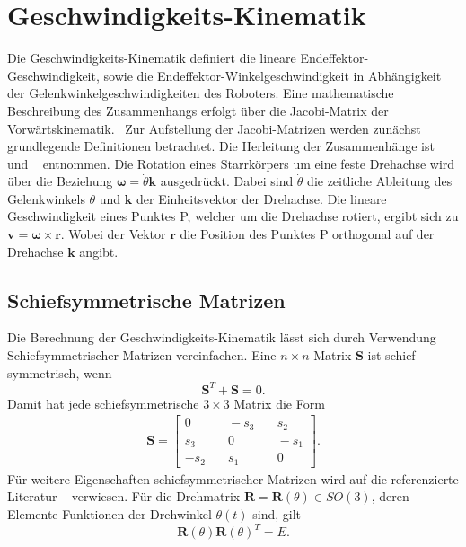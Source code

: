 \section{Geschwindigkeits-Kinematik}
Die Geschwindigkeits-Kinematik definiert die lineare Endeffektor-Geschwindigkeit, sowie die  Endeffektor-Winkelgeschwindigkeit in Abh{\"a}ngigkeit der Gelenkwinkelgeschwindigkeiten des Roboters. Eine mathematische Beschreibung des Zusammenhangs erfolgt {\"u}ber die Jacobi-Matrix der Vorw{\"a}rtskinematik.~\autocite[S.~101]{Spong.2020} Zur Aufstellung der Jacobi-Matrizen werden zunächst grundlegende Definitionen betrachtet. Die Herleitung der Zusammenhänge ist ~\autocite[S.~79--80]{Kemmetmueller.2023} und ~\autocite[S.~106]{Spong.2020} entnommen. Die Rotation eines Starrk{\"o}rpers um eine feste Drehachse wird über die Beziehung $\bm{\omega} = \dot{\theta}\bm{k}$ ausgedr{\"u}ckt. Dabei sind $\dot{\theta}$ die zeitliche Ableitung des Gelenkwinkels $\theta$ und $\bm{k}$ der Einheitsvektor der Drehachse. Die lineare Geschwindigkeit eines Punktes P, welcher um die Drehachse rotiert, ergibt sich zu $\bm{v} = \bm{\omega} \times \bm{r}$. Wobei der Vektor $\bm{r}$ die Position des Punktes P orthogonal auf der Drehachse $\bm{k}$ angibt.~\autocite[S.~102]{Spong.2020} 
%
\subsection{Schiefsymmetrische Matrizen}
Die Berechnung der Geschwindigkeits-Kinematik l{\"a}sst sich durch Verwendung Schiefsymmetrischer Matrizen vereinfachen. Eine $n\times n$ Matrix $\bm{S}$ ist schief symmetrisch, wenn 
\begin{equation}
	\label{eqn:skewsymmetric}
	\bm{S}^T+\bm{S}=0.
\end{equation}
Damit hat jede schiefsymmetrische $3\times3$ Matrix die Form
\begin{align}
	\bm{S} = \left[\begin{matrix}
		0 &\quad -s_3 &\quad s_2  \\
		s_3 &\quad 0 &\quad -s_1  \\
		-s_2 &\quad s_1 &\quad 0  
	\end{matrix}\right].
\end{align}
Für weitere Eigenschaften schiefsymmetrischer Matrizen wird auf die referenzierte Literatur ~\autocite[S.~104]{Spong.2020} verwiesen. Für die Drehmatrix $\bm{R} = \bm{R}(\theta) \in SO(3)$, deren Elemente Funktionen der Drehwinkel $\theta\left(t\right)$ sind, gilt 
\begin{equation}
	\label{eqn:einheitsmatrix}
	\bm{R}(\theta)\bm{R}(\theta)^T = E.
\end{equation}
%
